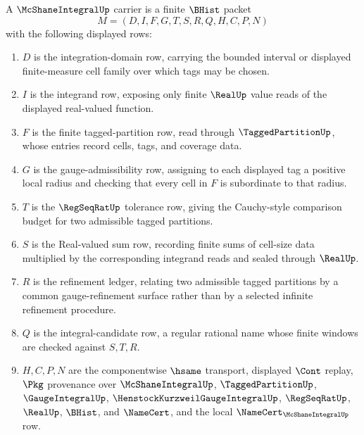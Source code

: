 \begin{definition}
\label{def:mcshane-integral-carrier}
A $\McShaneIntegralUp$ carrier is a finite $\BHist$ packet
$$
M=(D,I,F,G,T,S,R,Q,H,C,P,N)
$$
with the following displayed rows:
\begin{enumerate}
\item $D$ is the integration-domain row, carrying the bounded interval or displayed finite-measure cell family over which tags may be chosen.
\item $I$ is the integrand row, exposing only finite $\RealUp$ value reads of the displayed real-valued function.
\item $F$ is the finite tagged-partition row, read through $\TaggedPartitionUp$, whose entries record cells, tags, and coverage data.
\item $G$ is the gauge-admissibility row, assigning to each displayed tag a positive local radius and checking that every cell in $F$ is subordinate to that radius.
\item $T$ is the $\RegSeqRatUp$ tolerance row, giving the Cauchy-style comparison budget for two admissible tagged partitions.
\item $S$ is the Real-valued sum row, recording finite sums of cell-size data multiplied by the corresponding integrand reads and sealed through $\RealUp$.
\item $R$ is the refinement ledger, relating two admissible tagged partitions by a common gauge-refinement surface rather than by a selected infinite refinement procedure.
\item $Q$ is the integral-candidate row, a regular rational name whose finite windows are checked against $S,T,R$.
\item $H,C,P,N$ are the componentwise $\hsame$ transport, displayed $\Cont$ replay, $\Pkg$ provenance over $\McShaneIntegralUp$, $\TaggedPartitionUp$, $\GaugeIntegralUp$, $\HenstockKurzweilGaugeIntegralUp$, $\RegSeqRatUp$, $\RealUp$, $\BHist$, and $\NameCert$, and the local $\NameCert_{\McShaneIntegralUp}$ row.
\end{enumerate}
\end{definition}

